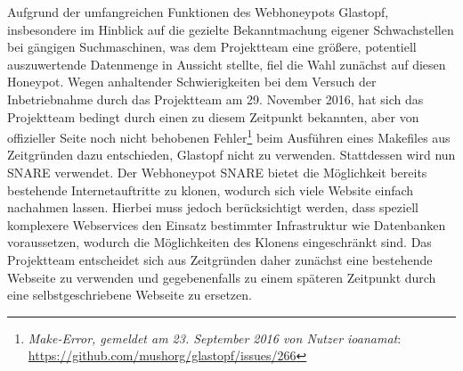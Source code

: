 Aufgrund der umfangreichen Funktionen des Webhoneypots Glastopf, insbesondere im Hinblick auf die gezielte Bekanntmachung eigener Schwachstellen bei gängigen Suchmaschinen, was dem Projektteam eine größere, potentiell auszuwertende Datenmenge in Aussicht stellte, fiel die Wahl zunächst auf diesen Honeypot. Wegen anhaltender Schwierigkeiten bei dem Versuch der Inbetriebnahme durch das Projektteam am 29. November 2016, hat sich das Projektteam bedingt durch einen zu diesem Zeitpunkt bekannten, aber von offizieller Seite noch nicht behobenen Fehler\footnote{ \textit{Make-Error, gemeldet am 23. September 2016 von Nutzer ioanamat}: \url{https://github.com/mushorg/glastopf/issues/266}} beim Ausführen eines Makefiles aus Zeitgründen dazu entschieden, Glastopf nicht zu verwenden. Stattdessen wird nun SNARE verwendet. Der Webhoneypot SNARE bietet die Möglichkeit bereits bestehende Internetauftritte zu klonen, wodurch sich viele Website einfach nachahmen lassen. Hierbei muss jedoch berücksichtigt werden, dass speziell komplexere Webservices den Einsatz bestimmter Infrastruktur wie Datenbanken voraussetzen, wodurch die Möglichkeiten des Klonens eingeschränkt sind. Das Projektteam entscheidet sich aus Zeitgründen daher zunächst eine bestehende Webseite zu verwenden und gegebenenfalls zu einem späteren Zeitpunkt durch eine selbstgeschriebene Webseite zu ersetzen.

